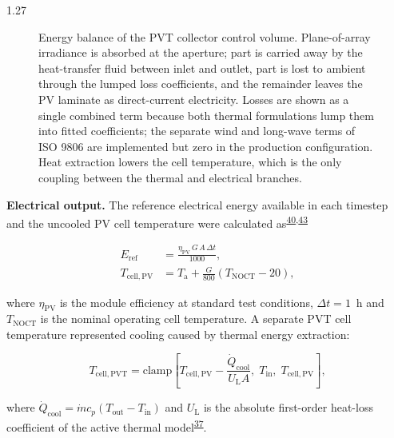 \documentclass[12pt,letterpaper]{article}
\DeclareRobustCommand{\citenum}[1]{\hyperlink{ref:#1}{#1}} %
\begin{document}
\begin{spacing}{1.27}
\begin{figure}[!htb]
{\begin{tikzpicture}[x=1cm, y=1cm, every node/.style={font=\small}]
\end{tikzpicture}%
}
\caption{Energy balance of the PVT collector control volume. Plane-of-array irradiance is absorbed at the aperture; part is carried away by the heat-transfer fluid between inlet and outlet, part is lost to ambient through the lumped loss coefficients, and the remainder leaves the PV laminate as direct-current electricity. Losses are shown as a single combined term because both thermal formulations lump them into fitted coefficients; the separate wind and long-wave terms of ISO 9806 are implemented but zero in the production configuration. Heat extraction lowers the cell temperature, which is the only coupling between the thermal and electrical branches.}
\label{fig:pvt-balance}
\end{figure}

\vspace{0.15in}

\textbf{Electrical output.} The reference electrical energy available in each timestep and the uncooled PV cell temperature were calculated as\textsuperscript{\citenum{40},\citenum{43}}

\begin{align}
E_{\mathrm{ref}} &= \frac{\eta_{\mathrm{PV}}\,G\,A\,\Delta t}{1000}, \label{eq:eref}\\
T_{\mathrm{cell,PV}} &= T_{\mathrm{a}} + \frac{G}{800}\left(T_{\mathrm{NOCT}}-20\right), \label{eq:tcellpv}
\end{align}

\noindent where $\eta_{\mathrm{PV}}$ is the module efficiency at standard test conditions, $\Delta t=1$~h and $T_{\mathrm{NOCT}}$ is the nominal operating cell temperature. A separate PVT cell temperature represented cooling caused by thermal energy extraction:

\begin{equation}
T_{\mathrm{cell,PVT}} = \mathrm{clamp}\left[T_{\mathrm{cell,PV}} - \frac{\dot{Q}_{\mathrm{cool}}}{U_{\mathrm{L}}A},\; T_{\mathrm{in}},\; T_{\mathrm{cell,PV}}\right],
\label{eq:tcellpvt}
\end{equation}

\noindent where $\dot{Q}_{\mathrm{cool}} = \dot{m}c_p\left(T_{\mathrm{out}}-T_{\mathrm{in}}\right)$ and $U_{\mathrm{L}}$ is the absolute first-order heat-loss coefficient of the active thermal model\textsuperscript{\citenum{37}}.\par

\vspace{0.15in}


\end{spacing}
\end{document}

